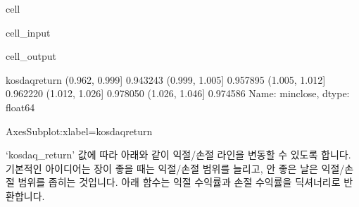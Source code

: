 \documentclass[letterpaper,10pt,english]{jupyterBook}
\begin{document}
\begin{sphinxuseclass}{cell}\begin{sphinxVerbatimInput}

\begin{sphinxuseclass}{cell_input}
\begin{sphinxVerbatim}[commandchars=\\\{\}]
  \PYG{p}{[}\PYG{p}{]} 
\PYG{p}{[}\PYG{p}{]}
\PYG{p}{[}\PYG{p}{]}
\end{sphinxVerbatim}

\end{sphinxuseclass}\end{sphinxVerbatimInput}
\begin{sphinxVerbatimOutput}

\begin{sphinxuseclass}{cell_output}
\begin{sphinxVerbatim}[commandchars=\\\{\}]
kosdaq\PYGZus{}return
(0.962, 0.999]    0.943243
(0.999, 1.005]    0.957895
(1.005, 1.012]    0.962220
(1.012, 1.026]    0.978050
(1.026, 1.046]    0.974586
Name: min\PYGZus{}close, dtype: float64
\end{sphinxVerbatim}

\begin{sphinxVerbatim}[commandchars=\\\{\}]
\PYGZlt{}AxesSubplot:xlabel=\PYGZsq{}kosdaq\PYGZus{}return\PYGZsq{}\PYGZgt{}
\end{sphinxVerbatim}

\noindent{}

\end{sphinxuseclass}\end{sphinxVerbatimOutput}

\end{sphinxuseclass}
\sphinxAtStartPar
 ‘kosdaq\_return’ 값에 따라 아래와 같이 익절/손절 라인을 변동할 수 있도록 합니다. 기본적인 아이디어는 장이 좋을 때는 익절/손절 범위를 늘리고, 안 좋은 날은 익절/손절 범위를 좁히는 것입니다. 아래 함수는 익절 수익률과 손절 수익률을 딕셔너리로 반환합니다.
\end{document}
